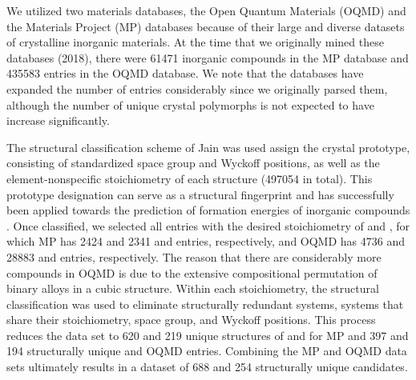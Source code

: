 %
We utilized two materials databases, the Open Quantum Materials (OQMD) and the Materials Project (MP) databases because of their large and diverse datasets of crystalline inorganic materials.
%
At the time that we originally mined these databases (2018), there were \num{61471} inorganic compounds in the MP database and \num{435583} entries in the OQMD database.
%
We note that the databases have expanded the number of entries considerably since we originally parsed them,
although the number of unique crystal polymorphs is not expected to have increase significantly.


%
%
The structural classification scheme of Jain  was used assign the crystal prototype, consisting of standardized space group and Wyckoff positions, as well as the element-nonspecific stoichiometry of each structure (\num{497054} in total). This prototype designation can serve as a structural fingerprint and has successfully been applied towards the prediction of formation energies of inorganic compounds \cite{Jain2018}.
%
%
Once classified, we selected all entries with the desired stoichiometry of \ABtwo and \ABthree,
for which MP has \num{2424} and \num{2341} \ABtwo and \ABthree entries, respectively,
and OQMD has \num{4736} and \num{28883} \ABtwo and \ABthree entries, respectively.
%
The reason that there are considerably more \ABthree compounds in OQMD is due to the extensive compositional permutation of binary alloys in a cubic \ABthree structure.
%
Within each stoichiometry, the structural classification was used to eliminate structurally redundant systems,
 systems that share their stoichiometry, space group, and Wyckoff positions.
%
This process reduces the data set to \num{620} and \num{219} unique structures of \ABtwo and \ABthree for MP and \num{397} and \num{194} structurally unique \ABtwo and \ABthree OQMD entries.
%
Combining the MP and OQMD data sets ultimately results in a dataset of \num{688} \ABtwo and \num{254} \ABthree structurally unique candidates.


